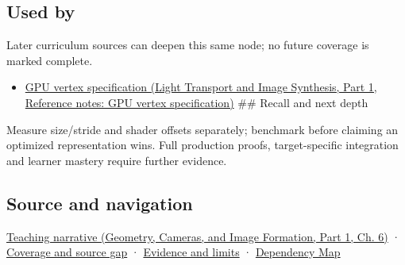 \subsection{Used by}\label{appendix-26bf6bf2fb8b-used-by}

\hypertarget{appendix-26bf6bf2fb8b-used-by}{}

Later curriculum sources can deepen this same node; no future coverage is marked complete.

\begin{itemize}
\tightlist
\item
  \href{../04-Light-Transport-and-Image-Synthesis-P01/main.pdf\#nameddest=appendix-749ba51a6c25}{GPU vertex specification (Light Transport and Image Synthesis, Part 1, Reference notes: GPU vertex specification)} \#\# Recall and next depth
\end{itemize}

Measure size/stride and shader offsets separately; benchmark before claiming an optimized representation wins. Full production proofs, target-specific integration and learner mastery require further evidence.

\subsection{Source and navigation}\label{appendix-26bf6bf2fb8b-source-and-navigation}

\hypertarget{appendix-26bf6bf2fb8b-source-and-navigation}{}

\href{../03-Geometry-Cameras-and-Image-Formation-P01/main.pdf\#nameddest=02-foundations-ii-ch037-storage-and-computation-can-choose-different-layouts}{Teaching narrative (Geometry, Cameras, and Image Formation, Part 1, Ch. 6)} · \hyperref[appendix-fd090d982a15-phase-6---parts-501-600]{Coverage and source gap} · \hyperref[appendix-a103e7846d21-phase-6---source-analysis-and-verification]{Evidence and limits} · \hyperref[appendix-4ad47bdd269a]{Dependency Map}
